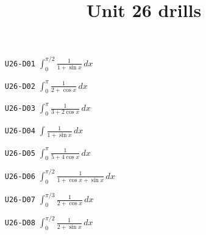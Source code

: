 \title{Unit 26 drills}\maketitle\begin{enumerate}
  \item[\texttt{U26-D01}] $\displaystyle \int_{0}^{\pi/2}\frac{1}{1+\sin x}\,dx$
  \item[\texttt{U26-D02}] $\displaystyle \int_{0}^{\pi}\frac{1}{2+\cos x}\,dx$
  \item[\texttt{U26-D03}] $\displaystyle \int_{0}^{\pi}\frac{1}{3+2\cos x}\,dx$
  \item[\texttt{U26-D04}] $\displaystyle \int\frac{1}{1+\sin x}\,dx$
  \item[\texttt{U26-D05}] $\displaystyle \int_{0}^{\pi}\frac{1}{5+4\cos x}\,dx$
  \item[\texttt{U26-D06}] $\displaystyle \int_{0}^{\pi/2}\frac{1}{1+\cos x+\sin x}\,dx$
  \item[\texttt{U26-D07}] $\displaystyle \int_{0}^{\pi/3}\frac{1}{2+\cos x}\,dx$
  \item[\texttt{U26-D08}] $\displaystyle \int_{0}^{\pi/2}\frac{1}{2+\sin x}\,dx$
\end{enumerate}

